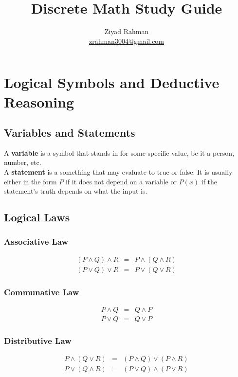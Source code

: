 \documentclass{article}
\title{Discrete Math Study Guide}
\author{Ziyad Rahman \\ \href{mailto:zrahman3004@gmail.com}{zrahman3004@gmail.com}}
\date{}
\begin{document}
\maketitle
\tableofcontents

\section{Logical Symbols and Deductive Reasoning}
\subsection{Variables and Statements}
A \textbf{variable} is a symbol that stands in for some specific value, be it a
person, number, etc. \\

\noindent A \textbf{statement} is a something that may evaluate to true or false.
It is usually either in the form $P$ if it does not depend on a variable
or $P(x)$ if the statement's truth depends on what the input is.

\subsection{Logical Laws}
\subsubsection{Associative Law}
\begin{eqnarray}
    (P \land Q) \land R &=& P \land (Q \land R) \\
    (P \lor Q) \lor R &=& P \lor (Q \lor R)
\end{eqnarray}

\subsubsection{Communative Law}
\begin{eqnarray}
    P \land Q &=& Q \land P \\
    P \lor Q &=& Q \lor P
\end{eqnarray}
\subsubsection{Distributive Law}
\begin{eqnarray}
    P \land (Q \lor R) &=& (P \land Q) \lor (P \land R) \\
    P \lor (Q \land R) &=& (P \lor Q) \land (P \lor R)
\end{eqnarray}
\end{document}
